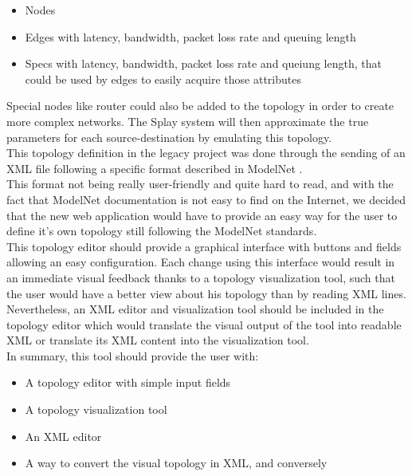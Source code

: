 \documentclass{eplmastersthesis}
\begin{document}
          \begin{itemize}
            \item Nodes
            \item Edges with latency, bandwidth, packet loss rate and queuing
            length
            \item Specs with latency, bandwidth, packet loss rate and queiung
            length, that could be used by edges to easily acquire those
            attributes
          \end{itemize}

          Special nodes like router could also be added to the topology in order
          to create more complex networks. The Splay system will then
          approximate the true parameters for each source-destination by
          emulating this topology.\\

          This topology definition in the legacy project was done through
          the sending of an XML file following a specific format described
          in ModelNet \cite{ModelNet}.\\
          This format not being really user-friendly and quite hard to read,
          and with the fact that ModelNet documentation is not easy to find
          on the Internet, we decided that the new web application would have
          to provide an easy way for the user to define it's own topology
          still following the ModelNet standards.\\

          This topology editor should provide a graphical interface with
          buttons and fields allowing an easy configuration. Each change
          using this interface would result in an immediate visual feedback
          thanks to a topology visualization tool, such that the user would
          have a better view about his topology than by reading XML lines.
          Nevertheless, an XML editor and visualization tool should be included
          in the topology editor which would translate the visual output of
          the tool into readable XML or translate its XML content into the
          visualization tool.\\

          In summary, this tool should provide the user with:

          \begin{itemize}
            \item A topology editor with simple input fields
            \item A topology visualization tool
            \item An XML editor
            \item A way to convert the visual topology in XML, and conversely
          \end{itemize}
\end{document}
